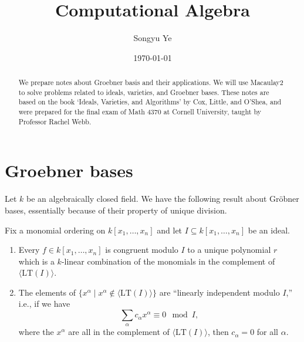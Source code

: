 \documentclass[12pt]{article}
\newcounter{problem}
\begin{document}
\rhead{\today}
\cfoot{\thepage}

\title{Computational Algebra}

\author{Songyu Ye}
\date{\today}
\maketitle


\begin{abstract}
	We prepare notes about Groebner basis and their applications. We will use Macaulay2 to solve problems related to ideals, varieties, and Groebner bases. These notes are based on the book `Ideals, Varieties, and Algorithms' by Cox, Little, and O'Shea, and were prepared for the final exam of Math 4370 at Cornell University, taught by Professor Rachel Webb.
\end{abstract}

\tableofcontents

\section{Groebner bases}
Let $k$ be an algebraically closed field.
We have the following result about Gr\"obner bases, essentially because of their property of unique division.

\begin{proposition}
	Fix a monomial ordering on \( k[x_1, \dots, x_n] \) and let \( I \subseteq k[x_1, \dots, x_n] \) be an ideal.

	\begin{enumerate}
		\item Every \( f \in k[x_1, \dots, x_n] \) is congruent modulo \( I \) to a unique polynomial \( r \) which is a \( k \)-linear combination of the monomials in the complement of \(\langle \mathrm{LT}(I) \rangle\).
		\item The elements of \( \{x^\alpha \mid x^\alpha \notin \langle \mathrm{LT}(I) \rangle \} \) are ``linearly independent modulo \( I \),'' i.e., if we have
		      \[
			      \sum_\alpha c_\alpha x^\alpha \equiv 0 \mod I,
		      \]
		      where the \( x^\alpha \) are all in the complement of \( \langle \mathrm{LT}(I) \rangle \), then \( c_\alpha = 0 \) for all \( \alpha \).
	\end{enumerate}
\end{proposition}
\end{document}
